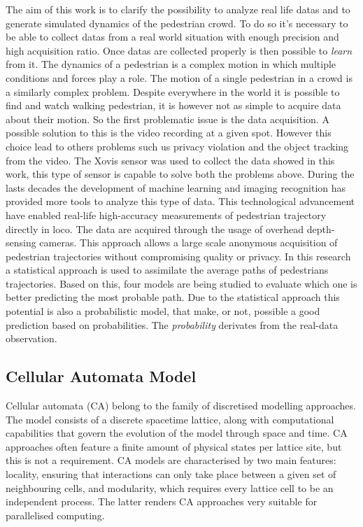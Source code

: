 \documentclass[class=article, crop=false]{standalone}
\begin{document}
The aim of this work is to clarify the possibility to analyze real life datas and to generate simulated dynamics of the pedestrian crowd.
To do so it's necessary to be able to collect datas from a real world situation with enough precision and high acquisition ratio.
Once datas are collected properly is then possible to \emph{learn} from it.
The dynamics of a pedestrian is a complex motion in which multiple conditions and forces play a role.
The motion of a single pedestrian in a crowd is a similarly complex problem.
Despite everywhere in the world it is possible to find and watch walking pedestrian, it is however not as simple to acquire data about their motion.
So the first problematic issue is the data acquisition.
A possible solution to this is the video recording at a given spot.
However this choice lead to others problems such us privacy violation and the object tracking from the video.
The Xovis sensor was used to collect the data showed in this work, this type of sensor is capable to solve both the problems above.
During the lasts decades the development of machine learning and imaging recognition has provided more tools to analyze this type of data.
This technological advancement have enabled real-life high-accuracy measurements of pedestrian trajectory directly in loco.
The data are acquired through the usage of overhead depth-sensing cameras.
This approach allows a large scale anonymous acquisition of pedestrian trajectories without compromising quality or privacy.
In this research a statistical approach is used to assimilate the average paths of pedestrians trajectories.
Based on this, four models are being studied to evaluate which one is better predicting the most probable path.
Due to the statistical approach this potential is also a probabilistic model, that make, or not, possible a good prediction based on probabilities.
The \emph{probability} derivates from the real-data observation.


\subsection{Cellular Automata Model}
Cellular automata (CA) belong to the family of discretised modelling approaches. The model consists of a discrete spacetime lattice, along with computational capabilities that govern the evolution of the model through space and time. CA approaches often feature a finite amount of physical states per lattice site, but this is not a requirement. CA models are characterised by two main features: locality, ensuring that interactions can only take place between a given set of neighbouring cells, and modularity, which requires every lattice cell to be an independent process. The latter renders CA approaches very suitable for parallelised computing.
\end{document}
